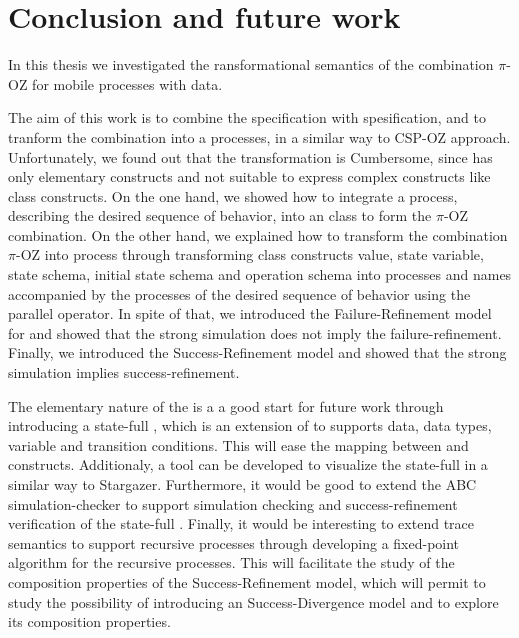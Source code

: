 \chapter{Conclusion and future work}
\label{sec_conclusion}
In this thesis we investigated the ransformational semantics of the combination $\pi$-OZ for mobile processes with data.

The aim of this work is to combine the \oz{} specification with \picalc{} spesification, and to tranform the combination into a \picalc{} processes, in a similar way to CSP-OZ \cite{olderog} approach. Unfortunately, we found out that the transformation is Cumbersome, since \picalc{} has only elementary constructs and not suitable to express complex constructs like \oz{} class constructs. On the one hand, we showed how to integrate a \picalc{} process, describing the desired sequence of behavior, into an \oz{} class to form the $\pi$-OZ combination. On the other hand, we explained how to transform the combination $\pi$-OZ into \picalc{} process through transforming \oz{} class constructs value, state variable, state schema, initial state schema and operation schema into \picalc{} processes and names accompanied by the processes of the desired sequence of behavior using the parallel operator. In spite of that, we introduced the Failure-Refinement model for \picalc{} and showed that the strong simulation does not imply the failure-refinement. Finally, we introduced the Success-Refinement model and showed that the strong simulation implies success-refinement. 

The elementary nature of the \picalc{} is a a good start for future work through introducing a state-full \picalc{}, which is an extension of \picalc{} to supports data, data types, variable and transition conditions. This will ease the mapping between \oz{} and \picalc{} constructs. Additionaly, a tool can be developed to visualize the state-full \picalc{} in a similar way to Stargazer\cite{stargazer}. Furthermore, it would be good to extend the ABC simulation-checker \cite{abc} to support simulation checking and success-refinement verification of the state-full \picalc{}. Finally, it would be interesting to extend \cite{gieseking} trace semantics to support recursive processes through developing a fixed-point algorithm for the recursive processes. This will facilitate the study of the composition properties of the Success-Refinement model, which will permit to study the possibility of introducing an Success-Divergence model and to explore its composition properties.

